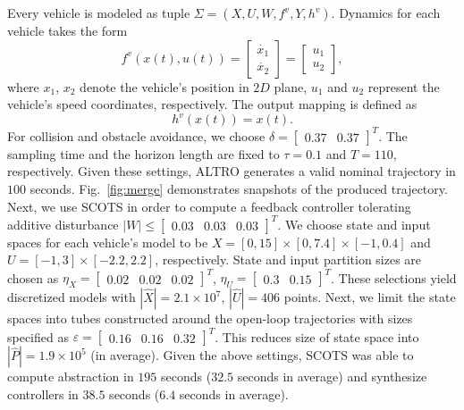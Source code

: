 Every vehicle is modeled as tuple $\Sigma=(X,U,W,f^v,Y,h^v)$. 
Dynamics for each vehicle takes the form
\begin{equation*}\label{eq:vehicle_ss}
	f^{v}(x(t),u(t))=
	\begin{bmatrix}
		\dot{x_1}\\
		\dot{x_2}
	\end{bmatrix}=
	\begin{bmatrix}
		u_1\\
		u_2
	\end{bmatrix},
\end{equation*}
where $x_1$, $x_2$ denote the vehicle's position in $2D$ plane, $u_1$ and $u_2$ represent the vehicle's speed coordinates, respectively. The output mapping is defined as
\[
h^v(x(t))=x(t).
\]
For collision and obstacle avoidance, we choose $\delta=\begin{bmatrix}0.37&0.37\end{bmatrix}^T$. The sampling time and the horizon length are fixed to $\tau=0.1$ and $T=110$, respectively. Given these settings, ALTRO generates a valid nominal trajectory in $100$ seconds. Fig.~\ref{fig:merge} demonstrates snapshots of the produced trajectory. Next, we use SCOTS in order to compute a feedback controller tolerating additive disturbance $|W|\leq\begin{bmatrix}0.03&0.03&0.03\end{bmatrix}^T$. We choose state and input spaces for each vehicle's model to be $X=[0,15]\times[0,7.4]\times[-1,0.4]$ and $U=[-1,3]\times[-2.2,2.2]$, respectively. State and input partition sizes are chosen as $\eta_{X}=\begin{bmatrix}0.02&0.02&0.02\end{bmatrix}^T$, $\eta_{U}=\begin{bmatrix}0.3&0.15\end{bmatrix}^T$. These selections yield discretized models with $|\hat X|=2.1\times 10^7$, $|\hat U|=406$ points. Next, we limit the state spaces into tubes constructed around the open-loop trajectories with sizes specified as $\varepsilon=\begin{bmatrix}0.16&0.16&0.32\end{bmatrix}^T$. This reduces size of state space into $|\hat P|=1.9\times 10^5$ (in average). Given the above settings, SCOTS was able to compute abstraction in $195$ seconds ($32.5$ seconds in average) and synthesize controllers in $38.5$ seconds ($6.4$ seconds in average).




